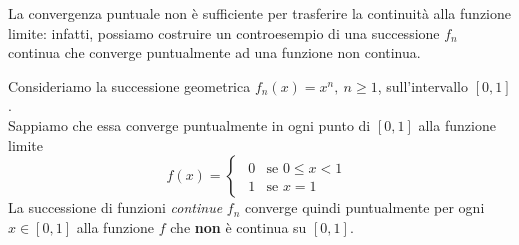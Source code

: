 La convergenza puntuale non è sufficiente per trasferire la continuità alla funzione limite: infatti, possiamo costruire un controesempio di una successione $f_n$ continua che converge puntualmente ad una funzione non continua.
\begin{example}
Consideriamo la successione geometrica $f_n(x)=x^n,\ n\geq1$, sull'intervallo $[0,1]$.\\
Sappiamo che essa converge puntualmente in ogni punto di $[0,1]$ alla funzione limite 
\begin{equation*}
	f(x)=
	\begin{cases}
		\begin{array}{ll}
			0&\text{se }0\leq x < 1\\
			1&\text{se }x=1
		\end{array}
	\end{cases}
\end{equation*}
La successione di funzioni \textit{continue} $f_n$ converge quindi puntualmente per ogni $x\in[0,1]$ alla funzione $f$ che \textbf{non} è continua su $[0,1]$.
\end{example}
